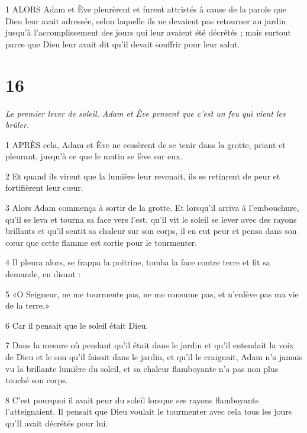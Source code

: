 \par 1 ALORS Adam et Ève pleurèrent et furent attristés à cause de la parole que Dieu leur avait adressée, selon laquelle ils ne devaient pas retourner au jardin jusqu'à l'accomplissement des jours qui leur avaient été décrétés ; mais surtout parce que Dieu leur avait dit qu'il devait souffrir pour leur salut.

\chapter{16}

\par \textit{Le premier lever de soleil. Adam et Ève pensent que c'est un feu qui vient les brûler.}

\par 1 APRÈS cela, Adam et Ève ne cessèrent de se tenir dans la grotte, priant et pleurant, jusqu'à ce que le matin se lève sur eux.

\par 2 Et quand ils virent que la lumière leur revenait, ils se retinrent de peur et fortifièrent leur cœur.

\par 3 Alors Adam commença à sortir de la grotte. Et lorsqu'il arriva à l'embouchure, qu'il se leva et tourna sa face vers l'est, qu'il vit le soleil se lever avec des rayons brillants et qu'il sentit sa chaleur sur son corps, il en eut peur et pensa dans son cœur que cette flamme est sortie pour le tourmenter.

\par 4 Il pleura alors, se frappa la poitrine, tomba la face contre terre et fit sa demande, en disant :

\par 5 «O Seigneur, ne me tourmente pas, ne me consume pas, et n'enlève pas ma vie de la terre.»

\par 6 Car il pensait que le soleil était Dieu.

\par 7 Dans la mesure où pendant qu'il était dans le jardin et qu'il entendait la voix de Dieu et le son qu'il faisait dans le jardin, et qu'il le craignait, Adam n'a jamais vu la brillante lumière du soleil, et sa chaleur flamboyante n'a pas non plus touché son corps.

\par 8 C'est pourquoi il avait peur du soleil lorsque ses rayons flamboyants l'atteignaient. Il pensait que Dieu voulait le tourmenter avec cela tous les jours qu'Il avait décrétés pour lui.

